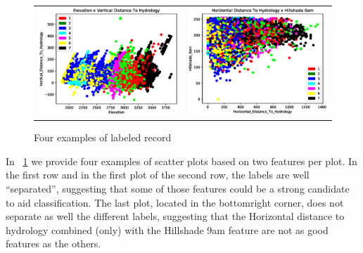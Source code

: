\begin{figure}[htpb]
\begin{tabular}{cc}
		\includegraphics[scale=0.45]{figs/3.eps} & \includegraphics[scale=0.45]{figs/4.eps} \\ 
	\end{tabular} 
	\caption{Four examples of labeled record}
	\label{fig:plots}
\end{figure}
In \figurename~\ref{fig:plots} we provide four examples of scatter plots based on two features per plot. In the first row and in the first plot of the second row, the labels are well ``separated'', suggesting that some of those features could be a strong candidate to aid classification. The last plot, located in the bottom\-right corner, does not separate as well the different labels, suggesting that the Horizontal distance to hydrology combined (only) with the Hillshade 9am feature are not as good features as the others.